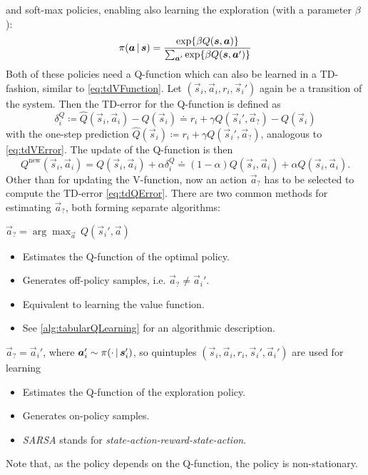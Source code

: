 		and soft-max policies, enabling also learning the exploration (with a parameter \(\beta\)):
		\begin{equation*}
			\pi(\bm{a} \,\vert\, \bm{s}) = \frac{\exp{ \beta Q(\bm{s}, \bm{a}) }}{\sum_{\bm{a}'} \exp{ \beta Q(\bm{s}, \bm{a}') }}
		\end{equation*}
		Both of these policies need a Q-function which can also be learned in a TD-fashion, similar to \eqref{eq:tdVFunction}. Let \( (\vec{s}_i, \vec{a}_i, r_i, \vec{s}_i') \) again be a transition of the system. Then the TD-error for the Q-function is defined as
		\begin{equation}
			\delta_i^Q \coloneqq \hat{Q}(\vec{s}_i, \vec{a}_i) - Q(\vec{s}_i) \doteq r_i + \gamma Q(\vec{s}_i', \vec{a}_?) - Q(\vec{s}_i)  \label{eq:tdQError}
		\end{equation}
		with the one-step prediction \( \hat{Q}(\vec{s}_i) \coloneqq r_i + \gamma Q(\vec{s}_i', \vec{a}_?) \), analogous to \eqref{eq:tdVError}. The update of the Q-function is then
		\begin{equation*}
			Q^\mathrm{new}(\vec{s}_i, \vec{a}_i) = Q(\vec{s}_i, \vec{a}_i) + \alpha \delta_i^Q \doteq (1 - \alpha) Q(\vec{s}_i, \vec{a}_i) + \alpha \hat{Q}(\vec{s}_i, \vec{a}_i).
		\end{equation*}
		Other than for updating the V-function, now an action \( \vec{a}_? \) has to be selected to compute the TD-error \eqref{eq:tdQError}. There are two common methods for estimating \(\vec{a}_?\), both forming separate algorithms:
		\begin{description}[leftmargin=3cm]
			\item[Q-Learning] \( \vec{a}_? = \arg\max_{\vec{a}} \, Q(\vec{s}_i', \vec{a}) \)
				\begin{itemize}
					\item Estimates the Q-function of the optimal policy.
					\item Generates off-policy samples, i.e. \( \vec{a}_? \neq \vec{a}_i' \).
					\item Equivalent to learning the value function.
					\item See \autoref{alg:tabularQLearning} for an algorithmic description.
				\end{itemize}
			\item[SARSA]      \( \vec{a}_? = \vec{a}_i' \), where \( \bm{a}_i' \sim \pi(\cdot \,\vert\, \bm{s}_i') \), so quintuples \( (\vec{s}_i, \vec{a}_i, r_i, \vec{s}_i', \vec{a}_i') \) are used for learning
				\begin{itemize}
					\item Estimates the Q-function of the exploration policy.
					\item Generates on-policy samples.
					\item \emph{SARSA} stands for \emph{state-action-reward-state-action}.
				\end{itemize}
		\end{description}
		Note that, as the policy depends on the Q-function, the policy is non-stationary.

